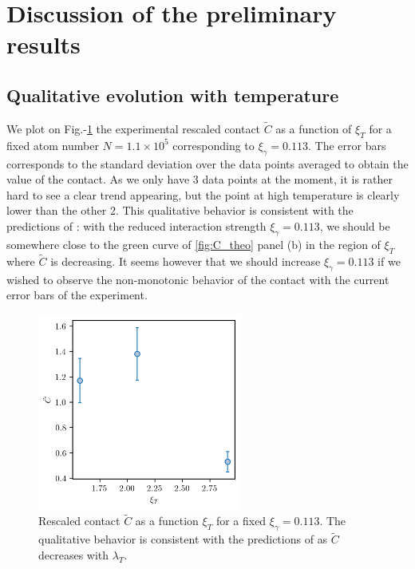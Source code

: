 \section{Discussion of the preliminary results}

\subsection{Qualitative evolution with temperature}

We plot on Fig.-\ref{fig:C_tilde_vs_T} the experimental rescaled contact $\tilde{C}$ as a function of $\xi_T$ for a fixed atom number $N=1.1 \times 10^5$ corresponding to $\xi_{\gamma}=0.113$. The error bars corresponds to the standard deviation over the data points averaged to obtain the value of the contact. As we only have 3 data points at the moment, it is rather hard to see a clear trend appearing, but the point at high temperature is clearly lower than the other 2. This qualitative behavior is consistent with the predictions of \cite{yao2018tan}: with the reduced interaction strength $\xi_{\gamma}=0.113$, we should be somewhere close to the green curve of \ref{fig:C_theo} panel (b) in the region of $\xi_T$ where $\tilde{C}$ is decreasing. It seems however that we should increase $\xi_{\gamma}=0.113$ if we wished to observe the non-monotonic behavior of the contact with the current error bars of the experiment.

\begin{figure}
    \centering
    \includegraphics[width=0.6\textwidth]{Fig/Chapter5/C_tilde_vs_T.png}
    \caption[Rescaled contact $\tilde{C}$ as a function $\xi_T$ for a fixed $\xi_{\gamma}=0.113$]{Rescaled contact $\tilde{C}$ as a function $\xi_T$ for a fixed $\xi_{\gamma}=0.113$. The qualitative behavior is consistent with the predictions of \cite{yao2018tan} as $\tilde{C}$ decreases with $\lambda_T$. }
    \label{fig:C_tilde_vs_T}
\end{figure}

